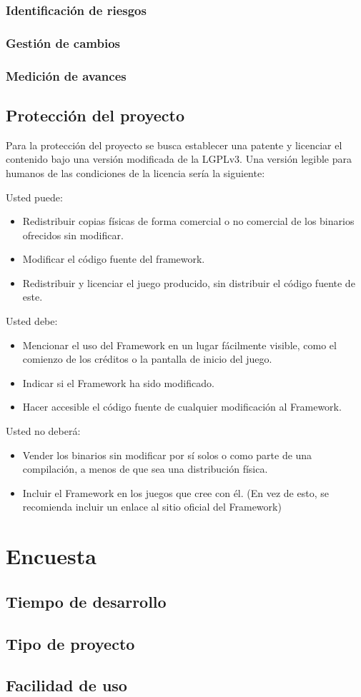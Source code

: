 \documentclass[]{article}
\begin{document}
\subsubsection{Identificaci\'on de riesgos}
\subsubsection{Gesti\'on de cambios}
\subsubsection{Medici\'on de avances}

\subsection{Protecci\'on del proyecto}
Para la protecci\'on del proyecto se busca establecer una patente y licenciar el contenido bajo una versi\'on modificada de la LGPLv3. Una versi\'on legible para humanos de las condiciones de la licencia ser\'ia la siguiente: 
\newline

Usted puede:
\begin{itemize}
	\item Redistribuir copias f\'isicas de forma comercial o no comercial de los binarios ofrecidos sin modificar. 
	\item Modificar el c\'odigo fuente del framework.
	\item Redistribuir y licenciar el juego producido, sin distribuir el c\'odigo fuente de este. 
\end{itemize}

Usted debe:
\begin{itemize}
	\item Mencionar el uso del Framework en un lugar f\'acilmente visible, como el comienzo de los cr\'editos o la pantalla de inicio del juego. 
	\item Indicar si el Framework ha sido modificado.
	\item Hacer accesible el c\'odigo fuente de cualquier modificaci\'on al Framework. 
\end{itemize}

Usted no deber\'a:
\begin{itemize}
	\item Vender los binarios sin modificar por s\'i solos o como parte de una compilaci\'on, a menos de que sea una distribuci\'on f\'isica.  
	\item Incluir el Framework en los juegos que cree con \'el. (En vez de esto, se recomienda incluir un enlace al sitio oficial del Framework)
\end{itemize}
\section{Encuesta}
\subsection{Tiempo de desarrollo}
\subsection{Tipo de proyecto}
\subsection{Facilidad de uso}

\newpage


\end{document}
